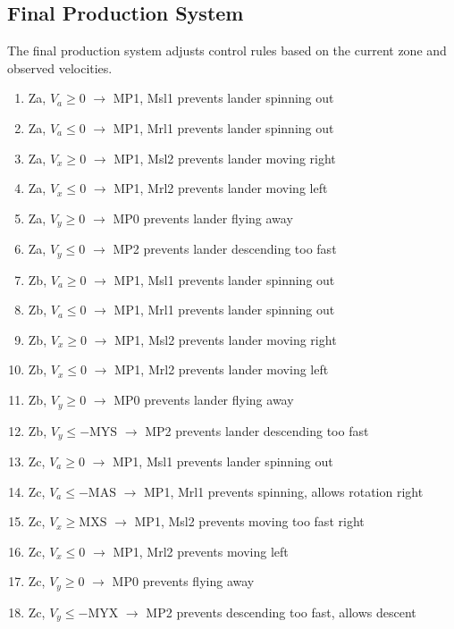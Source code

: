 \documentclass{article}
\begin{document}
\subsection{Final Production System}
The final production system adjusts control rules based on the current zone and observed velocities. 
\\
\begin{enumerate}
    \item Za, $V_a \geq 0$ $\rightarrow$ MP1, Msl1 \hfill prevents lander spinning out
    \item Za, $V_a \leq 0$ $\rightarrow$ MP1, Mrl1 \hfill prevents lander spinning out
    \item Za, $V_x \geq 0$ $\rightarrow$ MP1, Msl2 \hfill prevents lander moving right
    \item Za, $V_x \leq 0$ $\rightarrow$ MP1, Mrl2 \hfill prevents lander moving left
    \item Za, $V_y \geq 0$ $\rightarrow$ MP0 \hfill prevents lander flying away
    \item Za, $V_y \leq 0$ $\rightarrow$ MP2 \hfill prevents lander descending too fast
    \item Zb, $V_a \geq 0$ $\rightarrow$ MP1, Msl1 \hfill prevents lander spinning out
    \item Zb, $V_a \leq 0$ $\rightarrow$ MP1, Mrl1 \hfill prevents lander spinning out
    \item Zb, $V_x \geq 0$ $\rightarrow$ MP1, Msl2 \hfill prevents lander moving right
    \item Zb, $V_x \leq 0$ $\rightarrow$ MP1, Mrl2 \hfill prevents lander moving left
    \item Zb, $V_y \geq 0$ $\rightarrow$ MP0 \hfill prevents lander flying away
    \item Zb, $V_y \leq -\text{MYS}$ $\rightarrow$ MP2 \hfill prevents lander descending too fast
    \item Zc, $V_a \geq 0$ $\rightarrow$ MP1, Msl1 \hfill prevents lander spinning out
    \item Zc, $V_a \leq -\text{MAS}$ $\rightarrow$ MP1, Mrl1 \hfill prevents spinning, allows rotation right
    \item Zc, $V_x \geq \text{MXS}$ $\rightarrow$ MP1, Msl2 \hfill prevents moving too fast right
    \item Zc, $V_x \leq 0$ $\rightarrow$ MP1, Mrl2 \hfill prevents moving left
    \item Zc, $V_y \geq 0$ $\rightarrow$ MP0 \hfill prevents flying away
    \item Zc, $V_y \leq -\text{MYX}$ $\rightarrow$ MP2 \hfill prevents descending too fast, allows descent

\end{enumerate}
\end{document}
